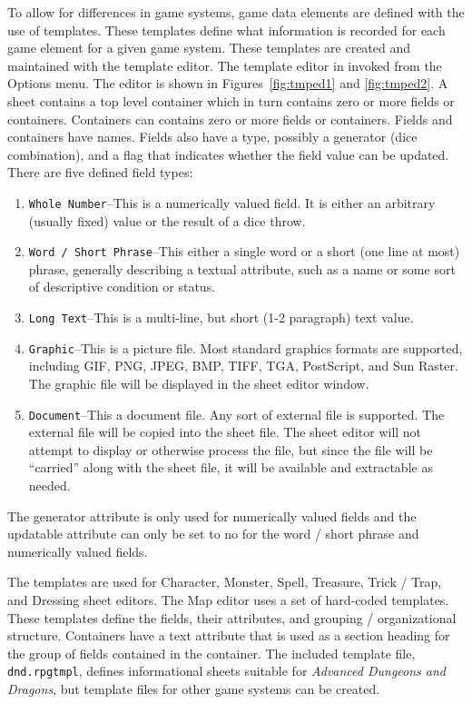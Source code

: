 To allow for differences in game systems, game data elements are
defined with the use of templates.  These templates define what
information is recorded for each game element for a given game system. 
These templates are created and maintained with the template editor. 
The template editor in invoked from the Options menu.  The editor is
shown in Figures~\ref{fig:tmped1} and \ref{fig:tmped2}.  A sheet
contains a top level container which in turn contains zero or more fields
or containers.  Containers can contains zero or more fields or
containers.  Fields and containers have names. Fields also have a type,
possibly a generator (dice combination), and a flag that indicates whether the
field value can be updated.  There are five defined field types:

\begin{enumerate}
\item \verb=Whole Number=--This is a numerically valued field. It is either
an arbitrary (usually fixed) value or the result of a dice throw.
\item \verb=Word / Short Phrase=--This either a single word or a short
(one line at most) phrase, generally describing a textual attribute,
such as a name or some sort of descriptive condition or status.
\item \verb=Long Text=--This is a multi-line, but short (1-2 paragraph)
text value.
\item \verb=Graphic=--This is a picture file.  Most standard graphics
formats are supported, including GIF, PNG, JPEG, BMP, TIFF, TGA,
PostScript, and Sun Raster.  The graphic file will be displayed in the
sheet editor window.
\item \verb=Document=--This a document file.  Any sort of external file
is supported.  The external file will be copied into the sheet file. 
The sheet editor will not attempt to display or otherwise process the
file, but since the file will be ``carried'' along with the sheet file,
it will be available and extractable as needed.
\end{enumerate}

The generator attribute is only used for numerically valued fields and
the updatable attribute can only be set to no for the word / short
phrase and numerically valued fields.

The templates are used for Character, Monster, Spell, Treasure, Trick /
Trap, and Dressing sheet editors.  The Map editor uses a set of hard-coded
templates. These templates define the fields, their attributes, and
grouping / organizational structure.  Containers have a text attribute
that is used as a section heading for the group of fields contained in
the container. The included template file, \verb=dnd.rpgtmpl=, defines
informational sheets suitable for \textit{Advanced Dungeons and
Dragons}, but template files for other game systems can be created.

